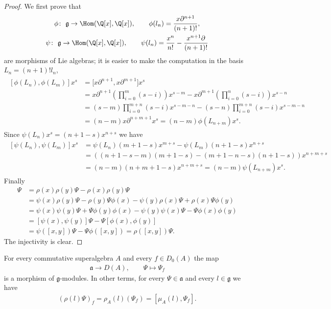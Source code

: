 \begin{proof}We f\/irst prove that
\begin{gather*} \phi\colon \ \mathfrak{g}\to \Hom(\Q[x],\Q[x]),\qquad
\phi(l_n)= \dfrac{x\partial^{n+1}}{(n+1)!} ,\\
 \psi\colon \ \mathfrak{g}\to \Hom(\Q[x],\Q[x]),\qquad
\psi(l_n)=\dfrac{x^n}{n!}-\dfrac{x^{n+1}\partial}{(n+1)!} \end{gather*}
are morphisms of Lie algebras; it is easier to make the computation in the basis $L_n=(n+1)! l_n$,
\begin{gather*} \begin{split}
[\phi(L_n),\phi(L_m)]x^s&=\big[x\partial^{n+1},x\partial^{m+1}\big]x^s\\
&=x\partial^{n+1}\left(\prod_{i=0}^{m}(s-i)\right)x^{s-m}-x\partial^{m+1}\left(\prod_{i=0}^{n}(s-i)\right)x^{s-n}\\
&=(s-m)\prod_{i=0}^{m+n}(s-i)x^{s-m-n}-(s-n)\prod_{i=0}^{m+n}(s-i)x^{s-m-n}\\
&=(n-m)x\partial^{n+m+1}x^s=(n-m)\phi(L_{n+m})x^s.\end{split}\end{gather*}
Since $\psi(L_n)x^s=(n+1-s)x^{n+s}$ we have
\begin{gather*}\begin{split}
[\psi(L_n),\psi(L_m)]x^s&=\psi(L_n)(m+1-s)x^{m+s}-\psi(L_m)(n+1-s)x^{n+s}\\
&=((n+1-s-m)(m+1-s)-(m+1-n-s)(n+1-s))x^{n+m+s}\\
&=(n-m)(n+m+1-s)x^{n+m+s}=(n-m)\psi(L_{n+m})x^s.\end{split}\end{gather*}
Finally
\begin{align*}
[\rho(x),\rho(y)]\Psi&=\rho(x)\rho(y)\Psi-\rho(x)\rho(y)\Psi\\
&=\psi(x)\rho(y)\Psi-\rho(y)\Psi\phi(x)-
\psi(y)\rho(x)\Psi+\rho(x)\Psi\phi(y)\\
&=\psi(x) \psi(y)\Psi+\Psi\phi(y)\phi(x)
-\psi(y)\psi(x)\Psi-\Psi\phi(x)\phi(y)\\
&=[\psi(x),\psi(y)]\Psi-\Psi[\phi(x),\phi(y)]\\
&=\psi([x,y])\Psi-\Psi\phi([x,y])=\rho([x,y])\Psi .
\end{align*}
The injectivity is clear.
\end{proof}

\begin{Lemma} For every commutative superalgebra $A$ and every $f\in D_0(A)$ the map
\begin{gather*} \mathfrak{a}\to D(A),\qquad \Psi\mapsto \Psi_f\end{gather*}
is a morphism of $\mathfrak{g}$-modules. In other terms, for every $\Psi\in \mathfrak{a}$ and every $l\in \mathfrak{g}$ we have
\begin{gather}\label{equ.morfismogmoduli}
(\rho(l)\Psi)_f=\rho_A(l)(\Psi_f)=[\mu_A(l),\Psi_f] .
\end{gather}
\end{Lemma}

